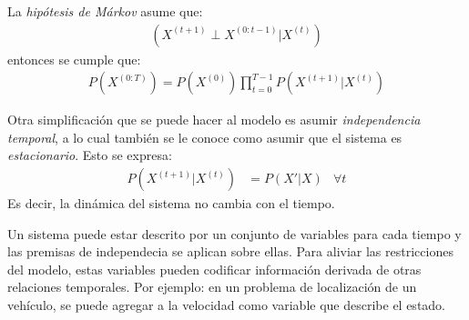 La \emph{hipótesis de Márkov} asume que:
\begin{align}
 (X^{(t+1)} \perp X^{(0:t-1)}|X^{(t)})
\end{align}
entonces se cumple que:
\begin{align}
 P(X^{(0:T)}) = P(X^{(0)})\prod^{T-1}_{t=0}P(X^{(t+1)}|X^{(t)})
\end{align}

Otra simplificación que se puede hacer al modelo es asumir \emph{independencia temporal}, a lo cual también se le conoce como asumir que el sistema es \emph{estacionario}.  Esto se expresa:
\begin{align}
 P(X^{(t+1)}|X^{(t)}) &= P(X'|X) & \forall t
\end{align}
Es decir, la dinámica del sistema no cambia con el tiempo.

Un sistema puede estar descrito por un conjunto de variables para cada tiempo y las premisas de independecia se aplican sobre ellas.  Para aliviar las restricciones del modelo, estas variables pueden codificar información derivada de otras relaciones temporales.  Por ejemplo: en un problema de localización de un vehículo, se puede agregar a la velocidad como variable que describe el estado.

\cite{Ross2013, Bolstad2007}
%

%

